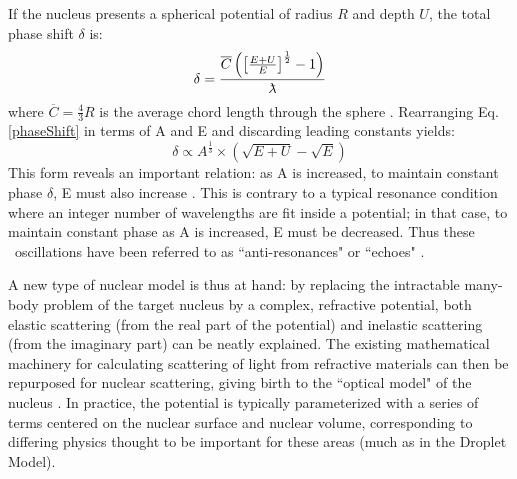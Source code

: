 If the nucleus presents a spherical potential of radius $R$ and depth $U$, the total phase shift $\delta$ is:
\begin{equation} \label{phaseShift}
    \delta =
    \frac{\overline{C}\left(\left[{\frac{E+U}{E}}\right]^{\frac{1}{2}}-1\right)}{\lambdabar}
\end{equation}
where $\overline{C} = \frac{4}{3}R$ is the average chord length through the
sphere \cite{Angeli1970}. Rearranging Eq. \ref{phaseShift} in terms of A and E and
discarding leading constants yields:
\begin{equation}
    \delta \propto A^{\frac{1}{3}}\times\left(\sqrt{E+U}-\sqrt{E}\right)
\end{equation}
This form reveals an important relation: as A is increased, to maintain constant 
phase $\delta$, E must also increase \cite{Satchler1980, Peterson1962}. 
This is contrary to a typical resonance condition where an integer number of wavelengths
are fit inside a potential; in that case, to maintain constant phase as A is increased,
E must be decreased. Thus these \tot\ oscillations have been referred to as
``anti-resonances" or ``echoes" \cite{Satchler1980, McVoy1967}.

A new type of nuclear model is thus at hand: by replacing the intractable many-body problem
of the target nucleus by a complex, refractive potential, both elastic scattering (from the real 
part of the potential) and inelastic scattering (from the imaginary part) can be neatly 
explained. The existing mathematical machinery for calculating scattering of light from
refractive materials can then be repurposed for nuclear scattering, giving birth to
the ``optical model" of the nucleus \cite{Feshbach1958, McVoy1967}. In
practice, the potential is typically parameterized with a series of
terms centered on the nuclear surface and nuclear volume,
corresponding to differing physics thought to be important for these areas (much
as in the Droplet Model).

